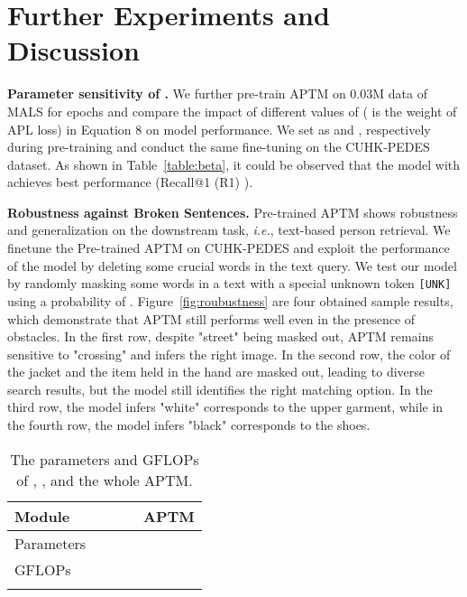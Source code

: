 \documentclass[sigconf]{acmart}
\def\ie{\emph{i.e.}}
\begin{document}
\section{Further Experiments and Discussion}
\textbf{Parameter sensitivity of .} 
We further pre-train APTM on 0.03M data of MALS for  epochs and compare the impact of different values of  ( is the weight of APL loss) in Equation 8 on model performance. 
We set  as  and , respectively during pre-training and conduct the same fine-tuning on the CUHK-PEDES dataset. 
As shown in Table~\ref{table:beta}, it could be observed that the model with  achieves best performance (Recall@1 (R1) ).

  
\noindent\textbf{Robustness against Broken Sentences.} 
Pre-trained APTM shows robustness and generalization on the downstream task, \ie, text-based person retrieval. We finetune the Pre-trained APTM on CUHK-PEDES and exploit the performance of the model by deleting some crucial words in the text query. We test our model by randomly masking some words in a text with a special unknown token \texttt{[UNK]} using a probability of . Figure~\ref{fig:roubustness} are four obtained sample results, which demonstrate that APTM still performs well even in the presence of obstacles. In the first row, despite "street" being masked out, APTM remains sensitive to "crossing" and infers the right image. In the second row, the color of the jacket and the item held in the hand are masked out, leading to diverse search results, but the model still identifies the right matching option. In the third row, the model infers "white" corresponds to the upper garment, while in the fourth row, the model infers "black" corresponds to the shoes.


\vspace{0.5cm}
\begin{table}[bp]
\small
\begin{center}
{
\setlength{\tabcolsep}{7pt}
\begin{tabular}{l|cccc}
\shline
Module          &  &  &  & APTM \\
\hline
Parameters &  &  &  &  \\
GFLOPs     &  &  &  &  \\
\shline
\end{tabular}}
\end{center}
\caption{The parameters and GFLOPs of , ,  and the whole APTM.
}
\label{table:params}
\end{table}
\end{document}
